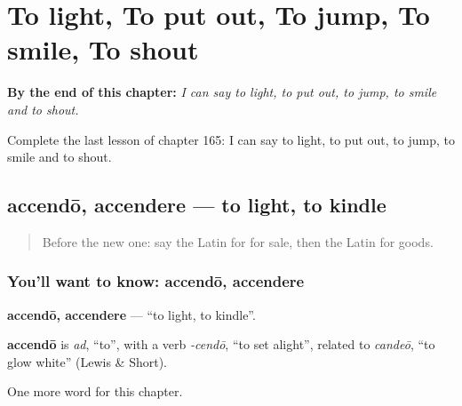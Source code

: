 
\chapter{To light, To put out, To jump, To smile, To shout}
\label{ch:la-to-light-to-put-out-to-jump-to-smile-to-shout}

\begin{chapteropening}
\textbf{By the end of this chapter:} \emph{I can say to light, to put out, to jump, to smile and to shout.}

Complete the last lesson of chapter 165: I can say to light, to put out, to jump, to smile and to shout.
\end{chapteropening}

\section[accendō, accendere]{accendō, accendere — to light, to kindle}

\label{lesson:LA-C165-accendo}



\begin{quote}
Before the new one: say the Latin for for sale, then the Latin for goods.
\end{quote}

\subsection*{You'll want to know: accendō, accendere}
\textbf{accendō, accendere} — \textquotedblleft{}to light, to kindle\textquotedblright{}.

\begin{cousinweb}
\textbf{accendō} is \emph{ad}, \textquotedblleft{}to\textquotedblright{}, with a verb \emph{-cendō}, \textquotedblleft{}to set alight\textquotedblright{}, related to \emph{candeō}, \textquotedblleft{}to glow white\textquotedblright{} (Lewis \& Short).
\end{cousinweb}

\begin{grammarlens}[title={What you've built}]
One more word for this chapter.
\end{grammarlens}

